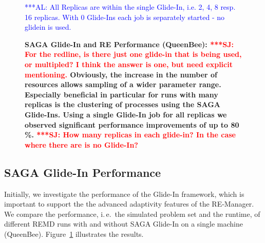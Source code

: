 \documentclass{rspublic}
\newcommand{\alnote}[1]{ {\textcolor{blue} { ***AL: #1 }}}
\newcommand{\jhanote}[1]{ {\textcolor{red} { ***SJ: #1 }}}
\newcommand{\alnote}[1]{}
\newcommand{\jhanote}[1]{}
\begin{document}
\begin{figure}[th]
    \centering      
        \caption{\footnotesize \bf SAGA Glide-In and RE Performance
          (QueenBee): \jhanote{For the redline, is there just one
            glide-in that is being used, or multipled? I think the
            answer is one, but need explicit mentioning.} 
          Obviously,
          the increase in the number of resources allows sampling of a
          wider parameter range. Especially beneficial in particular
          for runs with many replicas is the clustering of
          processes using the SAGA Glide-Ins. Using a single Glide-In
          job for all replicas we observed significant performance 
          improvements of up to 80\,\%.
          \jhanote{How many
            replicas in each glide-in? In the case where there are is
            no Glide-In?}}     
           \alnote{All Replicas are within the single Glide-In, i.e. 2, 4, 8 resp. 16 replicas.
           With 0 Glide-Ins each job is separately started - no glidein is used.}
    \label{fig:perf_remd_glidin}
\end{figure} 

\subsection{SAGA Glide-In Performance}

Initially, we investigate the performance of the Glide-In framework,
which is important to support the the advanced adaptivity features of
the RE-Manager.  We compare the performance, i.\,e.\ the simulated
problem set and the runtime, of different REMD runs with and without
SAGA Glide-In on a single machine (QueenBee).
Figure~\ref{fig:perf_remd_glidin} illustrates the results.
\end{document}

